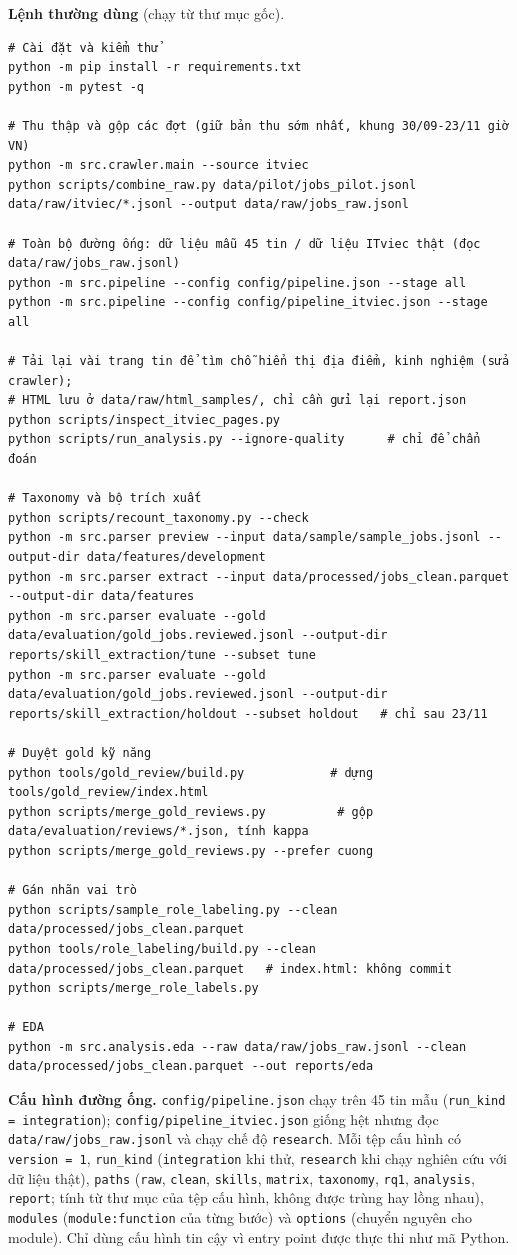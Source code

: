 \documentclass[12pt]{article}
\newcommand{\code}[1]{\texttt{#1}}
\begin{document}
\textbf{Lệnh thường dùng} (chạy từ thư mục gốc).
\begin{Verbatim}
# Cài đặt và kiểm thử
python -m pip install -r requirements.txt
python -m pytest -q

# Thu thập và gộp các đợt (giữ bản thu sớm nhất, khung 30/09-23/11 giờ VN)
python -m src.crawler.main --source itviec
python scripts/combine_raw.py data/pilot/jobs_pilot.jsonl data/raw/itviec/*.jsonl --output data/raw/jobs_raw.jsonl

# Toàn bộ đường ống: dữ liệu mẫu 45 tin / dữ liệu ITviec thật (đọc data/raw/jobs_raw.jsonl)
python -m src.pipeline --config config/pipeline.json --stage all
python -m src.pipeline --config config/pipeline_itviec.json --stage all

# Tải lại vài trang tin để tìm chỗ hiển thị địa điểm, kinh nghiệm (sửa crawler);
# HTML lưu ở data/raw/html_samples/, chỉ cần gửi lại report.json
python scripts/inspect_itviec_pages.py
python scripts/run_analysis.py --ignore-quality      # chỉ để chẩn đoán

# Taxonomy và bộ trích xuất
python scripts/recount_taxonomy.py --check
python -m src.parser preview --input data/sample/sample_jobs.jsonl --output-dir data/features/development
python -m src.parser extract --input data/processed/jobs_clean.parquet --output-dir data/features
python -m src.parser evaluate --gold data/evaluation/gold_jobs.reviewed.jsonl --output-dir reports/skill_extraction/tune --subset tune
python -m src.parser evaluate --gold data/evaluation/gold_jobs.reviewed.jsonl --output-dir reports/skill_extraction/holdout --subset holdout   # chỉ sau 23/11

# Duyệt gold kỹ năng
python tools/gold_review/build.py            # dựng tools/gold_review/index.html
python scripts/merge_gold_reviews.py          # gộp data/evaluation/reviews/*.json, tính kappa
python scripts/merge_gold_reviews.py --prefer cuong

# Gán nhãn vai trò
python scripts/sample_role_labeling.py --clean data/processed/jobs_clean.parquet
python tools/role_labeling/build.py --clean data/processed/jobs_clean.parquet   # index.html: không commit
python scripts/merge_role_labels.py

# EDA
python -m src.analysis.eda --raw data/raw/jobs_raw.jsonl --clean data/processed/jobs_clean.parquet --out reports/eda
\end{Verbatim}

\textbf{Cấu hình đường ống.} \code{config/pipeline.json} chạy trên 45 tin mẫu (\code{run\_kind = integration}); \code{config/pipeline\_itviec.json} giống hệt nhưng đọc \code{data/raw/jobs\_raw.jsonl} và chạy chế độ \code{research}. Mỗi tệp cấu hình có \code{version = 1}, \code{run\_kind} (\code{integration} khi thử, \code{research} khi chạy nghiên cứu với dữ liệu thật), \code{paths} (\code{raw}, \code{clean}, \code{skills}, \code{matrix}, \code{taxonomy}, \code{rq1}, \code{analysis}, \code{report}; tính từ thư mục của tệp cấu hình, không được trùng hay lồng nhau), \code{modules} (\code{module:function} của từng bước) và \code{options} (chuyển nguyên cho module). Chỉ dùng cấu hình tin cậy vì entry point được thực thi như mã Python.
\end{document}
